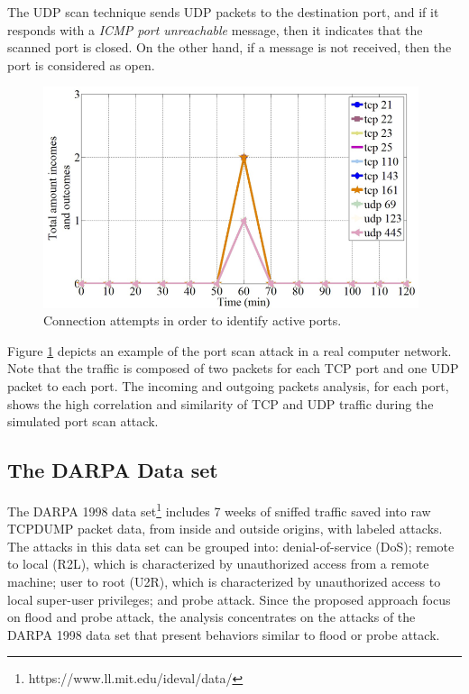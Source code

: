 The UDP scan technique sends UDP packets to the destination port, and if it responds with a \emph{ICMP port unreachable} message, then it indicates that the scanned port is closed. On the other hand, if a message is not received, then the port is considered as open.

\begin{figure}[h!]
     \centering 
     \includegraphics[width=11cm]{figs/ch2/fig07.png}
     \caption{Connection attempts in order to identify active ports.}
     \label{fig:2.07}
\end{figure}

Figure \ref{fig:2.07} depicts an example of the port scan attack in a real computer network. Note that the traffic is composed of two packets for each TCP port and one UDP packet to each port. The incoming and outgoing packets analysis, for each port, shows the high correlation and similarity of TCP and UDP traffic during the simulated port scan attack.

\subsection{The DARPA Data set}
\label{sec:2_Darpadata set}

The DARPA 1998 data set\footnote{https://www.ll.mit.edu/ideval/data/} includes 7 weeks of sniffed traffic saved into raw TCPDUMP packet data, from inside and outside origins, with labeled attacks. The attacks in this data set can be grouped into: denial-of-service (DoS); remote to local (R2L), which is characterized by unauthorized access from a remote machine; user to root (U2R), which is characterized by unauthorized access to local super-user privileges; and probe attack. Since the proposed approach focus on flood and probe attack, the analysis concentrates on the attacks of the DARPA 1998 data set that present behaviors similar to flood or probe attack. 

